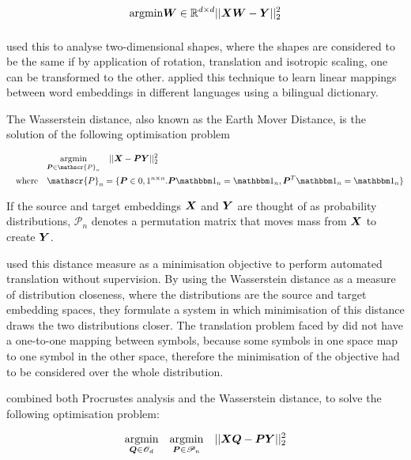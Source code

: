 \begin{equation}
    \underset{\quad}{\operatorname{argmin}}{\boldsymbol{W} \in \mathbb{R}^{d \times d}}  ||\boldsymbol{X} \boldsymbol{W} - \boldsymbol{Y}||_2^2
\end{equation}

\cite{Goodall1991MI} used this to analyse two-dimensional shapes, where the shapes are considered to be the same if by application of rotation, translation and isotropic scaling, one can be transformed to the other. \cite{MikolovMachineTranslation} applied this technique to learn linear mappings between word embeddings in different languages using a bilingual dictionary. 

The Wasserstein distance, also known as the Earth Mover Distance, is the solution of the following optimisation problem

\begin{equation}
\begin{split}
    &\argmin{\vecP \in \mathscr{P}_n} \quad || \vecX - \vecP \vecY ||_2^2 \\
    \spaced{where}&\mathscr{P}_n = \{\vecP \in {0, 1}^{n \times n}. \vecP \one_n = \one_n, \vecP^T \one_n = \one_n \}
\end{split}
\end{equation}

If the source and target embeddings $\boldsymbol{X}$ and $\boldsymbol{Y}$ are thought of as probability distributions, $\mathscr{P}_n$ denotes a permutation matrix that moves mass from $\boldsymbol{X}$ to create $\boldsymbol{Y}$. 

\cite{Zhang2017EarthMD} used this distance measure as a minimisation objective to perform automated translation without supervision. By using the Wasserstein distance as a measure of distribution closeness, where the distributions are the source and target embedding spaces, they formulate a system in which minimisation of this distance draws the two distributions closer. The translation problem faced by \cite{Zhang2017EarthMD} did not have a one-to-one mapping between symbols, because some symbols in one space map to one symbol in the other space, therefore the minimisation of the objective had to be considered over the whole distribution. 

\cite{UnsupervisedAlignmentWP} combined both Procrustes analysis and the Wasserstein distance, to solve the following optimisation problem:

\begin{equation}
\begin{split}
\underset{\boldsymbol{Q} \in \mathscr{O}_d}{\operatorname{argmin}} \quad \underset{\boldsymbol{P} \in \mathscr{P}_n }{\operatorname{argmin}}\quad || \boldsymbol{X} \boldsymbol{Q} - \boldsymbol{P} \boldsymbol{Y}||_2^2
\end{split}
\end{equation}


